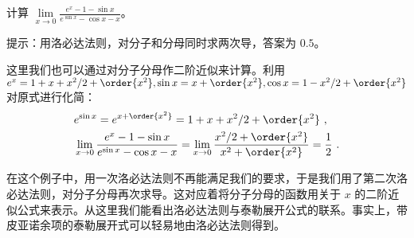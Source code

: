 \begin{exercise}{}
计算 $\lim\limits_{x\rightarrow 0}\frac{e^x-1-\sin x}{e^{\sin x} - \cos x - x}$。
\end{exercise}
提示：用洛必达法则，对分子和分母同时求两次导，答案为 $0.5$。

这里我们也可以通过对分子分母作二阶近似来计算。利用 $e^x=1+x+x^2/2+\order{x^2},\sin x=x+\order{x^2},\cos x=1-x^2/2+\order{x^2}$ 对原式进行化简：
\begin{equation}
\begin{aligned}
&e^{\sin x}=e^{x+\order{x^2}}=1+x+x^2/2+\order{x^2}~,\\
&\lim\limits_{x\rightarrow 0}\frac{e^x-1-\sin x}{e^{\sin x} - \cos x - x}=\lim\limits_{x\rightarrow 0}\frac{x^2/2+\order{x^2}}{x^2+\order{x^2}}=\frac{1}{2}~.
\end{aligned}
\end{equation}

在这个例子中，用一次洛必达法则不再能满足我们的要求，于是我们用了第二次洛必达法则，对分子分母再次求导。这对应着将分子分母的函数用关于 $x$ 的二阶近似公式来表示。从这里我们能看出洛必达法则与泰勒展开公式的联系。事实上，带皮亚诺余项的泰勒展开式可以轻易地由洛必达法则得到。
